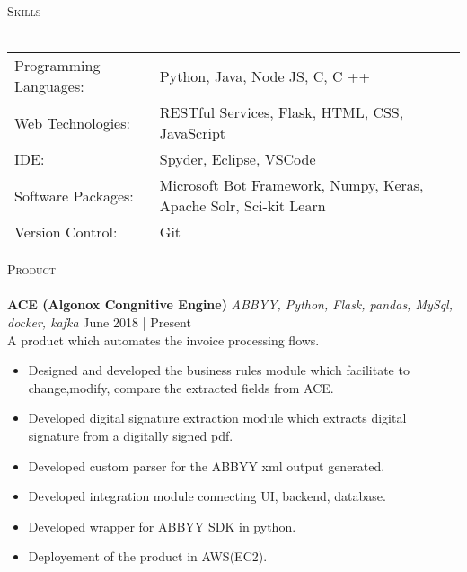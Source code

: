 \documentclass[a4paper]{article}
\newcommand{\lineunder} {
    \vspace*{-8pt} \\
    \hspace*{-18pt} \hrulefill \\
}
\newcommand{\header} [1] {
    {\hspace*{-18pt}\vspace*{6pt} \textsc{#1}}
    \vspace*{-6pt} \lineunder
}
\begin{document}
\header{Skills}
\begin{tabular}{ l l }
	Programming Languages: & Python, Java, Node JS, C, C ++                                    \\
	Web Technologies:      & RESTful Services, Flask, HTML, CSS, JavaScript                    \\
	IDE:                   & Spyder, Eclipse, VSCode                                           \\
	Software Packages:     & Microsoft Bot Framework, Numpy, Keras, Apache Solr, Sci-kit Learn \\
	Version Control:       & Git                                                               \\
\end{tabular}
\vspace{2mm}

\header{Product}
{\textbf{ACE (Algonox Congnitive Engine)}} {\sl ABBYY, Python, Flask, pandas, MySql, docker, kafka} \hfill June 2018 | Present\\
A product which automates the invoice processing flows.\\

\begin{itemize} \itemsep 1pt
	\item Designed and developed the business rules module which facilitate to change,modify, compare the extracted fields from ACE.
	\item Developed digital signature extraction module which extracts digital signature from a digitally signed pdf.
    \item Developed custom parser for the ABBYY xml output generated.   
    \item Developed integration module connecting UI, backend, database.
    \item Developed wrapper for ABBYY SDK in python.
    \item Deployement of the product in AWS(EC2).
\end{itemize}
\end{document}
